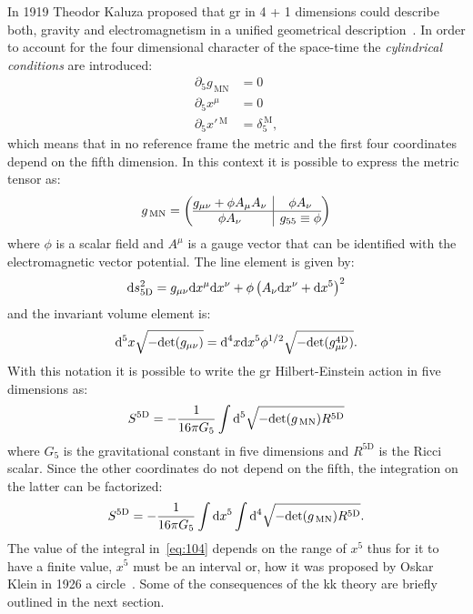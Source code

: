 In 1919 Theodor Kaluza proposed that \gls{gr} in 4 + 1 dimensions could describe
both, gravity and electromagnetism in a unified geometrical
description~\cite{Kaluza}. In order to account for the four dimensional
character of the space-time the \emph{cylindrical conditions} are introduced:
\begin{equation}
  \label{eq:98}
  \begin{aligned}
    \partial_5 g_\mathrm{\, MN} & = 0 \\
    \partial_5 x^\mu & = 0 \\
    \partial_5 x'{^\mathrm{\, M}} & = \delta^\mathrm{\, M}_{5},
  \end{aligned}
\end{equation}
which means that in no reference frame the metric and the first four coordinates
depend on the fifth dimension. In this context it is possible to express the
metric tensor as:
\begin{equation}
  \label{eq:100}
  g_{\mathrm{\, MN}} =
  \left(
    \begin{array}{@{}c|c@{}}
      g_{\mu\nu} + \phi A_\mu A_\nu & \phi A_\nu \\
      \hline
      \phi A_\nu & g_{55} \equiv \phi
    \end{array}
  \right)
\end{equation}
where $\phi$ is a scalar field and $A^\mu$ is a gauge vector that can be
identified with the electromagnetic vector potential. The line element is given
by:
\begin{equation}
  \label{eq:101}
  \mathrm{d} s^2_{5 \mathrm{D}} = g_{\mu\nu} \mathrm{d} x^\mu \mathrm{d} x^\nu + \phi \left( A_\nu
    \mathrm{d} x^\nu + \mathrm{d} x^5 \right)^2
\end{equation}
and the invariant volume element is:
\begin{equation}
  \label{eq:102}
  \mathrm{d}^5 x \sqrt{- \mathrm{det}(g_{\mu\nu})} = \mathrm{d}^4 x \mathrm{d} x^5 \phi^{1/2} \sqrt{-
  \mathrm{det}(g_{\mu\nu}^{4 \mathrm{D}})}.
\end{equation}
With this notation it is possible to write the \gls{gr} Hilbert-Einstein action
in five dimensions as:
\begin{equation}
  \label{eq:103}
  S^{5 \mathrm{D}} = - \frac{1}{16 \pi G_5} \int \mathrm{d}^5 \sqrt{-
    \mathrm{det}(g_{\mathrm{\, MN}}) R^{5 \mathrm{D}}}
\end{equation}
where $G_5$ is the gravitational constant in five dimensions and $R^{5
  \mathrm{D}}$ is the Ricci scalar. Since the other coordinates do not depend on
the fifth, the integration on the latter can be factorized:
\begin{equation}
  \label{eq:104}
  S^{5 \mathrm{D}} = - \frac{1}{16 \pi G_5} \int \mathrm{d} x^5 \int \mathrm{d}^4 \sqrt{-
    \mathrm{det}(g_{\mathrm{\, MN}}) R^{5 \mathrm{D}}}.
\end{equation}
The value of the integral in~\cref{eq:104} depends on the range of $x^5$ thus
for it to have a finite value, $x^5$ must be an interval or, how it was proposed
by Oskar Klein in 1926 a circle~\cite{Klein}. Some of the consequences of the
\gls{kk} theory are briefly outlined in the next section.
